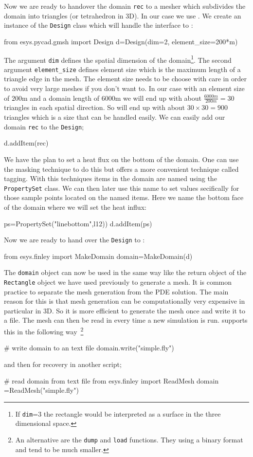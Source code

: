Now we are ready to handover the domain \verb|rec| to a mesher which subdivides the domain into triangles (or tetrahedron in 3D). In our case we use \gmsh. We create 
an instance of the \verb|Design| class which will handle the interface to \gmsh: 
\begin{python}
from esys.pycad.gmsh import Design 
d=Design(dim=2, element_size=200*m)
\end{python}
The argument \verb|dim| defines the spatial dimension of the domain\footnote{If \texttt{dim}=3 the rectangle would be interpreted as a surface in the three dimensional space.}. The second argument \verb|element_size| defines element size which is the maximum length of a triangle edge in the mesh. The element size needs to be choose with care in order to avoid very large meshes if you don't want to. In our case with an element size of $200$m 
and a domain length of $6000$m we will end up with about $\frac{6000m}{200m}=30$ triangles in each spatial direction. So will end up with about $30 \times 30 = 900$ triangles which is a size that can be handled easily.
We can easily add our domain \verb|rec| to the \verb|Design|;
\begin{python}
d.addItem(rec)
\end{python}
We have the plan to set a heat flux on the bottom of the domain. One can use the masking technique to do this
but \pycad offers a more convenient technique called tagging. With this techniques items in the domain are
named using the \verb|PropertySet| class. We can then later use this name to set values secifically for
those sample points located on the named items. Here we name the bottom face of the 
domain where we will set the heat influx:
\begin{python}
ps=PropertySet("linebottom",l12))
d.addItem(ps)
\end{python}
Now we are ready to hand over the \verb|Design| to \FINLEY:
\begin{python}
from esys.finley import MakeDomain
domain=MakeDomain(d)
\end{python}
The \verb|domain| object can now be used in the same way like the return object of the \verb|Rectangle| 
object we have used previously to generate a mesh. It is common practice to separate the 
mesh generation from the PDE solution. The main reason for this is that mesh generation can be computationally very expensive in particular in 3D. So it is more efficient to generate the mesh once and write it to a file. The mesh
can then be read in every time a new simulation is run. \FINLEY supports this in the following 
way~\footnote{An alternative are the \texttt{dump} and \texttt{load} functions. They using a binary format and tend to be much smaller.}
\begin{python}
# write domain to an text file
domain.write("simple.fly")
\end{python}
and then for recovery in another script;
\begin{python}
# read domain from text file
from esys.finley import ReadMesh
domain =ReadMesh("simple.fly")
\end{python}

